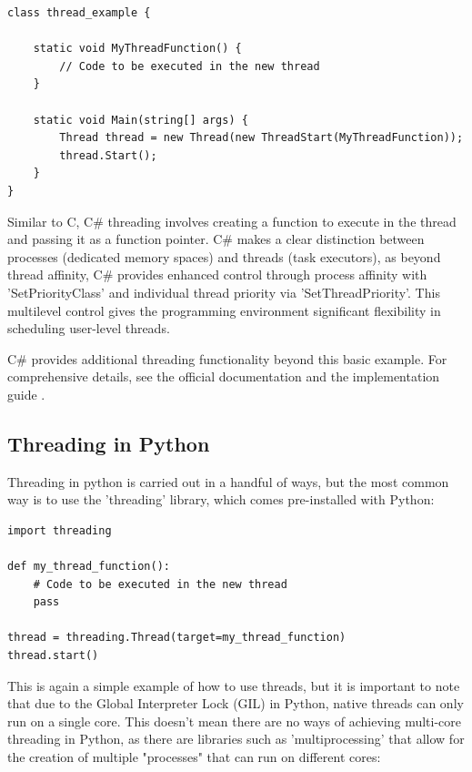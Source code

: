 \documentclass[12pt,a4paper]{article}
\begin{document}
\begin{verbatim}
class thread_example {

    static void MyThreadFunction() {
        // Code to be executed in the new thread
    }

    static void Main(string[] args) {
        Thread thread = new Thread(new ThreadStart(MyThreadFunction));
        thread.Start();
    }
}
\end{verbatim}

Similar to C, C\# threading involves creating a function to execute in the thread and passing it as a function pointer. C\# makes a clear distinction between processes (dedicated memory spaces) and threads (task executors)\parencite{White2020}, as beyond thread affinity, C\# provides enhanced control through process affinity with 'SetPriorityClass' and individual thread priority via 'SetThreadPriority'\parencite{CSThreadPriority}. This multilevel control gives the programming environment significant flexibility in scheduling user-level threads.

C\# provides additional threading functionality beyond this basic example. For comprehensive details, see the official documentation  and the implementation guide .

\subsection{Threading in Python}

Threading in python is carried out in a handful of ways, but the most common way is to use the 'threading' library\parencite{PythonThreading}, which comes pre-installed with Python:

\begin{verbatim}
import threading

def my_thread_function():
    # Code to be executed in the new thread
    pass

thread = threading.Thread(target=my_thread_function)
thread.start()
\end{verbatim}

This is again a simple example of how to use threads, but it is important to note that due to the Global Interpreter Lock (GIL) in Python, native threads can only run on a single core\parencite{PythonGIL}. This doesn't mean there are no ways of achieving multi-core threading in Python, as there are libraries such as 'multiprocessing' that allow for the creation of multiple "processes" that can run on different cores:
\end{document}
